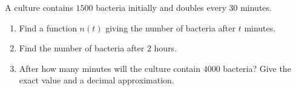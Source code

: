 A culture contains $1500$ bacteria initially and doubles every $30$ minutes.
\begin{enumerate}
\item[(a)] Find a function $n(t)$ giving the number of bacteria after $t$ minutes.
\item[(b)] Find the number of bacteria after $2$ hours.
\item[(c)] After how many minutes will the culture contain $4000$ bacteria? Give the exact value and a decimal approximation.
\end{enumerate}
